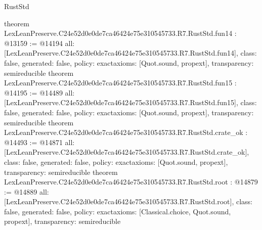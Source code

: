 \begin{lexlean}{RustStd}
\begin{coremodule}
{}
theorem LexLeanPreserve.C24e52d0e0de7ca46424e75e310545733.R7.RustStd.fun14 : @13159 := @14194 {
  all: [LexLeanPreserve.C24e52d0e0de7ca46424e75e310545733.R7.RustStd.fun14],
  class: false,
  generated: false,
  policy: exact{axioms: [Quot.sound, propext]},
  transparency: semireducible
}
theorem LexLeanPreserve.C24e52d0e0de7ca46424e75e310545733.R7.RustStd.fun15 : @14195 := @14489 {
  all: [LexLeanPreserve.C24e52d0e0de7ca46424e75e310545733.R7.RustStd.fun15],
  class: false,
  generated: false,
  policy: exact{axioms: [Quot.sound, propext]},
  transparency: semireducible
}
theorem LexLeanPreserve.C24e52d0e0de7ca46424e75e310545733.R7.RustStd.crate_ok : @14493 := @14871 {
  all: [LexLeanPreserve.C24e52d0e0de7ca46424e75e310545733.R7.RustStd.crate_ok],
  class: false,
  generated: false,
  policy: exact{axioms: [Quot.sound, propext]},
  transparency: semireducible
}
theorem LexLeanPreserve.C24e52d0e0de7ca46424e75e310545733.R7.RustStd.root : @14879 := @14889 {
  all: [LexLeanPreserve.C24e52d0e0de7ca46424e75e310545733.R7.RustStd.root],
  class: false,
  generated: false,
  policy: exact{axioms: [Classical.choice, Quot.sound, propext]},
  transparency: semireducible
}


\end{coremodule}
\end{lexlean}
